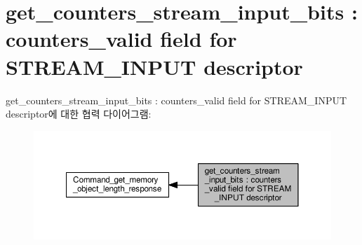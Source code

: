 \hypertarget{group__get__counters__stream__input__bits}{}\section{get\+\_\+counters\+\_\+stream\+\_\+input\+\_\+bits \+: counters\+\_\+valid field for S\+T\+R\+E\+A\+M\+\_\+\+I\+N\+P\+UT descriptor}
\label{group__get__counters__stream__input__bits}
get\+\_\+counters\+\_\+stream\+\_\+input\+\_\+bits \+: counters\+\_\+valid field for S\+T\+R\+E\+A\+M\+\_\+\+I\+N\+P\+UT descriptor에 대한 협력 다이어그램\+:
\nopagebreak
\begin{figure}[H]
\begin{center}
\leavevmode
\includegraphics[width=350pt]{group__get__counters__stream__input__bits}
\end{center}
\end{figure}

